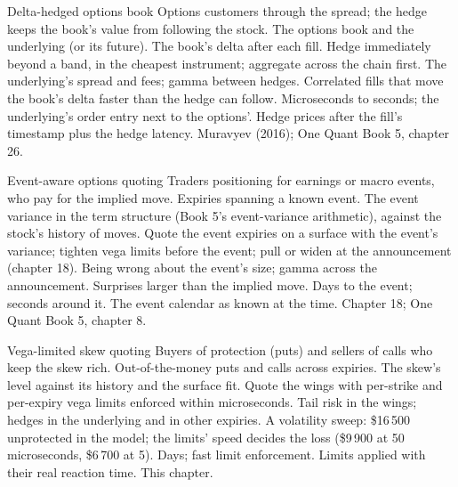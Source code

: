 \begin{strategyfile}{Delta-hedged options book}\label{strat:hf:automated-options-market-making:delta}
 Options customers through the spread; the hedge keeps the book's value from following the stock.
 The options book and the underlying (or its future).
 The book's delta after each fill.
 Hedge immediately beyond a band, in the cheapest instrument; aggregate across the chain first.
 The underlying's spread and fees; gamma between hedges.
 Correlated fills that move the book's delta faster than the hedge can follow.
 Microseconds to seconds; the underlying's order entry next to the options'.
 Hedge prices after the fill's timestamp plus the hedge latency.
 Muravyev (2016); One Quant Book 5, chapter 26.
\end{strategyfile}

\begin{strategyfile}{Event-aware options quoting}\label{strat:hf:automated-options-market-making:event}
 Traders positioning for earnings or macro events, who pay for the implied move.
 Expiries spanning a known event.
 The event variance in the term structure (Book 5's event-variance arithmetic), against the stock's history of moves.
 Quote the event expiries on a surface with the event's variance; tighten vega limits before the event; pull or widen at
the announcement (chapter 18).
 Being wrong about the event's size; gamma across the announcement.
 Surprises larger than the implied move.
 Days to the event; seconds around it.
 The event calendar as known at the time.
 Chapter 18; One Quant Book 5, chapter 8.
\end{strategyfile}

\begin{strategyfile}{Vega-limited skew quoting}\label{strat:hf:automated-options-market-making:vega}
 Buyers of protection (puts) and sellers of calls who keep the skew rich.
 Out-of-the-money puts and calls across expiries.
 The skew's level against its history and the surface fit.
 Quote the wings with per-strike and per-expiry vega limits enforced within microseconds.
 Tail risk in the wings; hedges in the underlying and in other expiries.
 A volatility sweep: \$16\,500 unprotected in the model; the limits' speed decides the loss (\$9\,900 at 50 microseconds,
\$6\,700 at 5).
 Days; fast limit enforcement.
 Limits applied with their real reaction time.
 This chapter.
\end{strategyfile}

